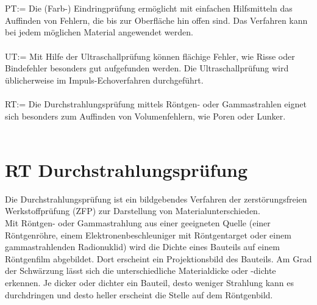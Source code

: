 \\
\\
PT:= Die (Farb-) Eindringprüfung ermöglicht mit einfachen Hilfsmitteln das Auffinden von Fehlern, die
bis zur Oberfläche hin offen sind. Das Verfahren kann bei jedem möglichen Material angewendet
werden.\\
\\
UT:= Mit Hilfe der Ultraschallprüfung können flächige Fehler, wie Risse oder Bindefehler besonders
gut aufgefunden werden. Die Ultraschallprüfung wird üblicherweise im Impuls-Echoverfahren
durchgeführt.\\
\\
RT:= Die Durchstrahlungsprüfung mittels Röntgen- oder Gammastrahlen eignet sich besonders zum
Auffinden von Volumenfehlern, wie Poren oder Lunker.\\
\\
\section{RT Durchstrahlungsprüfung}
\label{subsec:ndt}
Die Durchstrahlungsprüfung ist ein bildgebendes Verfahren der zerstörungsfreien Werkstoffprüfung (ZFP) zur Darstellung von Materialunterschieden.\\
Mit Röntgen- oder Gammastrahlung aus einer geeigneten Quelle (einer Röntgenröhre, einem Elektronenbeschleuniger mit Röntgentarget oder einem gammastrahlenden Radionuklid) wird die Dichte eines Bauteils auf einem Röntgenfilm abgebildet. Dort erscheint ein Projektionsbild des Bauteils. Am Grad der Schwärzung lässt sich die unterschiedliche Materialdicke oder -dichte erkennen. Je dicker oder dichter ein Bauteil, desto weniger Strahlung kann es durchdringen und desto heller erscheint die Stelle auf dem Röntgenbild.\\
\\
